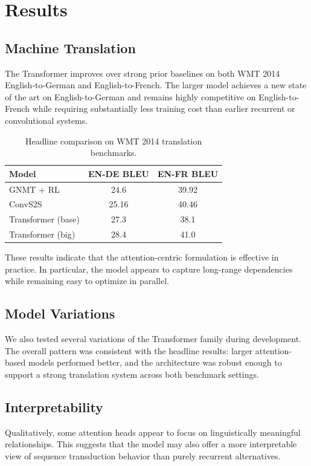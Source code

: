 \section{Results}

\subsection{Machine Translation}

The Transformer improves over strong prior baselines on both WMT 2014 English-to-German and English-to-French. The larger model achieves a new state of the art on English-to-German and remains highly competitive on English-to-French while requiring substantially less training cost than earlier recurrent or convolutional systems.

\begin{table}[h]
\centering
\caption{Headline comparison on WMT 2014 translation benchmarks.}
\label{tab:headline-results}
\begin{tabular}{lcc}
\toprule
Model & EN-DE BLEU & EN-FR BLEU \\
\midrule
GNMT + RL & 24.6 & 39.92 \\
ConvS2S & 25.16 & 40.46 \\
Transformer (base) & 27.3 & 38.1 \\
Transformer (big) & 28.4 & 41.0 \\
\bottomrule
\end{tabular}
\end{table}

These results indicate that the attention-centric formulation is effective in practice. In particular, the model appears to capture long-range dependencies while remaining easy to optimize in parallel.

\subsection{Model Variations}

We also tested several variations of the Transformer family during development. The overall pattern was consistent with the headline results: larger attention-based models performed better, and the architecture was robust enough to support a strong translation system across both benchmark settings.

\subsection{Interpretability}

Qualitatively, some attention heads appear to focus on linguistically meaningful relationships. This suggests that the model may also offer a more interpretable view of sequence transduction behavior than purely recurrent alternatives.

